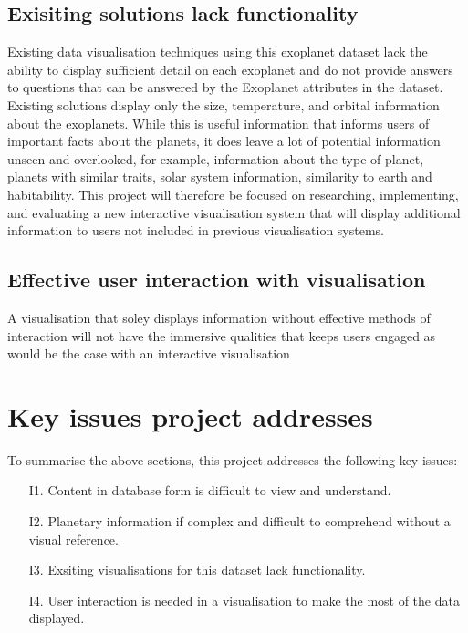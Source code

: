 \subsection{Exisiting solutions lack functionality}
Existing data visualisation techniques using this exoplanet dataset lack the ability to display sufficient detail on each exoplanet and do not provide answers to questions that can be answered by the Exoplanet attributes in the dataset. Existing solutions display only the size, temperature, and orbital information about the exoplanets. While this is useful information that informs users of important facts about the planets, it does leave a lot of potential information unseen and overlooked, for example, information about the type of planet, planets with similar traits, solar system information, similarity to earth and habitability. This project will therefore be focused on researching, implementing, and evaluating a new interactive visualisation system that will display additional information to users not included in previous visualisation systems.

\subsection{Effective user interaction with visualisation}
A visualisation that soley displays information without effective methods of interaction will not have the immersive qualities that keeps users engaged as would be the case with an interactive visualisation

\section{Key issues project addresses}
To summarise the above sections, this project addresses the following key issues:
\begin{enumerate}
 \item[I1.] Content in database form is difficult to view and understand.
 \item[I2.] Planetary information if complex and difficult to comprehend without a visual reference.
 \item[I3.] Exsiting visualisations for this dataset lack functionality.
 \item[I4.] User interaction is needed in a visualisation to make the most of the data displayed.
\end{enumerate}

